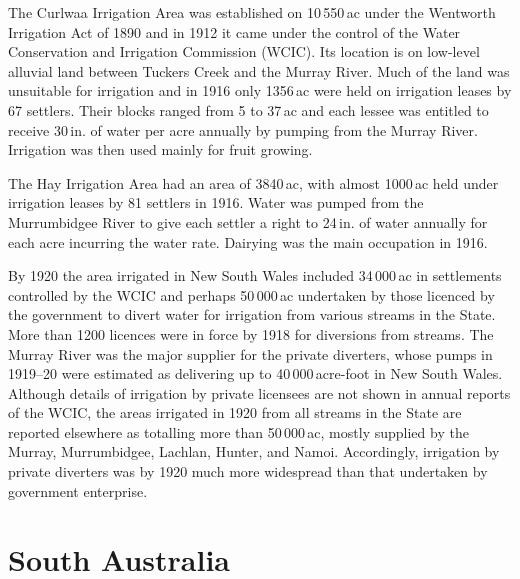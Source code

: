 The Curlwaa Irrigation Area was established on 10\,550\,ac under the
Wentworth Irrigation Act of 1890 and in 1912 it came under the control
of the Water Conservation and Irrigation Commission (WCIC). Its
location is on low-level alluvial land between Tuckers Creek and the
Murray River. Much of the land was unsuitable for irrigation and in
1916 only 1356\,ac were held on irrigation leases by 67 settlers.
Their blocks ranged from 5 to 37\,ac and each lessee was entitled to
receive 30\,in. of water per acre annually by pumping from the Murray
River.  Irrigation was then used mainly for fruit growing.

The Hay Irrigation Area had an area of 3840\,ac, with almost 1000\,ac
held under irrigation leases by 81 settlers in 1916. Water was pumped
from the Murrumbidgee River to give each settler a right to 24\,in. of
water annually for each acre incurring the water rate.  Dairying was
the main occupation in 1916.

By 1920 the area irrigated in New South Wales included 34\,000\,ac in
settlements controlled by the WCIC and perhaps 50\,000\,ac undertaken
by those licenced by the government to divert water for irrigation
from various streams in the State.  More than 1200 licences were in
force by 1918 for diversions from streams.  The Murray River was the
major supplier for the private diverters, whose pumps in 1919--20 were
estimated as delivering up to 40\,000\,acre-foot in New South Wales.
Although details of irrigation by private licensees are not shown in
annual reports of the WCIC, the areas irrigated in 1920 from all
streams in the State are reported elsewhere as totalling more than
50\,000\,ac, mostly supplied by the Murray, Murrumbidgee, Lachlan,
Hunter, and Namoi.  Accordingly, irrigation by private diverters was
by 1920 much more widespread than that undertaken by government
enterprise.

\section*{South Australia}

